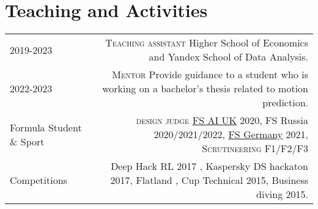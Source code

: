 \section*{\sectionformat Teaching and Activities}
\begin{tabular}{@{}L!{\VRule}R}
2019-2023  {} &
{\textsc{Teaching assistant}} Higher School of Economics and Yandex School of Data Analysis.
\\
2022-2023 {} 
& {\textsc{Mentor}} Provide guidance to a student who is working on a bachelor's thesis related to motion prediction.
\\
Formula Student \& Sport &
{\textsc{design judge}} \href{https://www.imeche.org/events/formula-student/team-information/fs-ai}{FS AI UK} 2020, FS Russia 2020/2021/2022, \href{https://www.formulastudent.de/fsg/}{FS Germany} 2021,
{\textsc{Scrutineering F1/F2/F3}}
\\
Competitions                   &
Deep Hack RL 2017 ,
Kaspersky DS hackaton 2017,
Flatland ,
Cup Technical 2015,
Business diving 2015.
\end{tabular}
